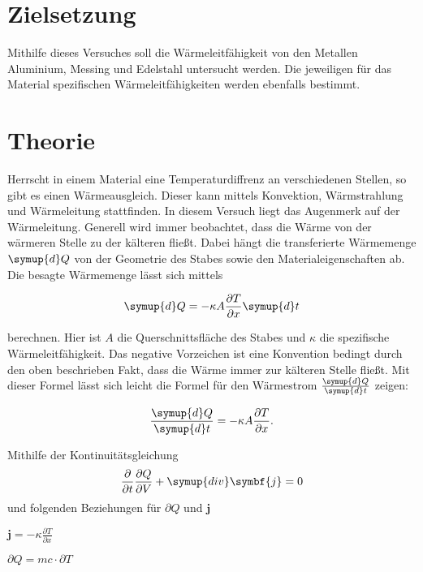 \section{Zielsetzung}
Mithilfe dieses Versuches soll die Wärmeleitfähigkeit von den Metallen Aluminium, Messing und Edelstahl untersucht werden.
Die jeweiligen für das Material spezifischen Wärmeleitfähigkeiten werden ebenfalls bestimmt.


\section{Theorie}
\label{sec:Theorie}

Herrscht in einem Material eine Temperaturdiffrenz an verschiedenen Stellen, so gibt es einen Wärmeausgleich.
Dieser kann mittels Konvektion, Wärmstrahlung und Wärmeleitung stattfinden. In diesem Versuch liegt das Augenmerk auf der Wärmeleitung.
Generell wird immer beobachtet, dass die Wärme von der wärmeren Stelle zu der kälteren fließt.
Dabei hängt die transferierte Wärmemenge $\symup{d}Q$ von der Geometrie des Stabes sowie den Materialeigenschaften ab. Die besagte Wärmemenge lässt sich mittels

\begin{equation}
\label{eqn:waermemenge}
    \symup{d}Q = -\kappa A \frac{\partial T}{\partial x}\symup{d}t
\end{equation}

berechnen. Hier ist $A$ die Querschnittsfläche des Stabes und $\kappa$ die spezifische Wärmeleitfähigkeit. Das negative Vorzeichen ist eine Konvention bedingt durch den oben beschrieben Fakt, dass die Wärme immer zur kälteren Stelle fließt.
Mit dieser Formel lässt sich leicht die Formel für den Wärmestrom $\frac{\symup{d}Q}{\symup{d}t}$ zeigen:

\begin{equation}
\label{eqn:waermestrom}
    \frac{\symup{d}Q}{\symup{d}t} = -\kappa A \frac{\partial T}{\partial x}.
\end{equation}

Mithilfe der Kontinuitätsgleichung 
\begin{equation}
\label{eqn:kontinuitaet}
    \frac{\partial}{\partial t}\frac{\partial Q}{\partial V} + \symup{div} \symbf{j} = 0
\end{equation}
und folgenden Beziehungen für $\partial Q$ und $\symbf{j}$

\centerline{$\symbf{j} = - \kappa \frac{\partial T}{\partial x}$}

\centerline{$\partial Q = mc \cdot \partial T$}

